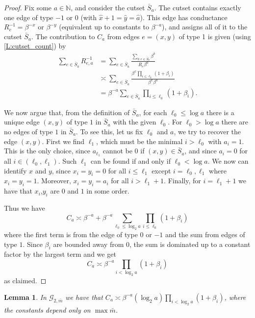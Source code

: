 \documentclass[12pt]{article}
\newtheorem{lemma}[thm]{Lemma}
\theoremstyle{definition}
\numberwithin{equation}{section}
\newcommand{\N}{\mathbb N}
\newcommand{\cG}{\mathcal{G}}
\renewcommand{\hat}{\widehat}
\newcommand{\mbar}{{\overline m}}
\begin{document}
\begin{proof}
  Fix some $a\in\N$, and consider the cutset $\bar S_a$.
  The cutset contains exactly one edge of type $-1$ or $0$ (with $\hat{x}+1=\hat{y}=\hat{a}$).
  This edge has conductance $R_e^{-1} = \beta^{-x}$ or $\beta^{-y}$ (equivalent up to constants to $\beta^{-a}$), and assigns all of it to the cutset $\bar{S}_a$.
  The contribution to $C_a$ from edges $e=(x,y)$ of type 1 is given (using \cref{L:cutset_count}) by
  \begin{align*}
    \sum_{e\in \bar S_a} R_{e,a}^{-1}
    &= \sum_{e\in \bar S_a}
    \frac{\sum_{b : e\in \bar S_b} \beta^b} {R_e \beta^a} \\
    &\asymp \sum_{e\in \bar S_a}
    \frac{\beta^x \prod_{i\leq\ell_0} (1+\beta_i)} {\beta^x \beta^a} \\
    &= \beta^{-a} \sum_{e\in \bar S_a} \prod_{i\leq\ell_0} (1+\beta_i).
  \end{align*}

  We now argue that, from the definition of $\bar S_a$, for each $\ell_0\leq \log a$ there is a unique edge $(x,y)$ of type $1$ in $\bar S_a$ with the given $\ell_0$.
  For $\ell_0>\log a$ there are no edges of type $1$ in $\bar S_a$.
  To see this, let us fix $\ell_0$ and $a$, we try to recover the edge $(x,y)$.
  First we find $\ell_1$, which must be the minimal  $i>\ell_0$ with $a_i=1$.
  This is the only choice, since $a_{\ell_1}$ cannot be $0$ if $(x,y)\in\bar S_a$, and since $a_i=0$ for all
  $i\in(\ell_0,\ell_1)$.
  Such $\ell_1$ can be found if and only if $\ell_0 < \log a$.
  We now can identify $x$ and $y$, since $x_i=y_i=0$ for all $i\leq \ell_1$ except $i=\ell_0,\ell_1$ where $x_i=y_i=1$.
  Moreover, $x_i=y_i=a_i$ for all $i>\ell_1+1$.
  Finally, for $i=\ell_1+1$ we have that $x_i$,$y_i$ are $0$ and $1$ in some order.

  Thus we have
  \[
    C_a \asymp \beta^{-a} + \beta^{-a} \sum_{\ell_0\leq \log_2 a} \prod_{i\leq \ell_0} (1+\beta_i)
  \]
  where the first term is from the edge of type $0$ or $-1$ and the sum from edges of type $1$.
  Since $\beta_i$ are bounded away from $0$, the sum is dominated up to a constant factor by the largest term and we get
  \[
    C_a \asymp \beta^{-a} \prod_{i < \log_2 a} (1+\beta_i)
  \]
  as claimed.
\end{proof}


\begin{lemma}\label{L:C_a_2}
  In $\cG_{2,\mbar}$ we have that $C_a \asymp \beta^{-a} (\log_2 a) \prod_{i<\log_2 a} (1+\beta_i)$, where the constants depend only on $\max \bar m$.
\end{lemma}
\end{document}
